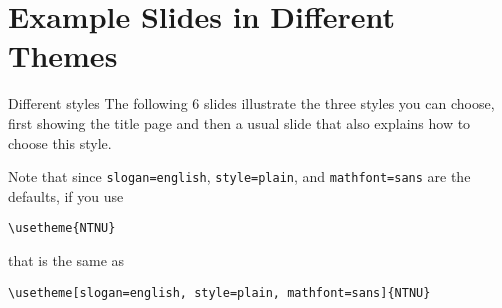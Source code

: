 \documentclass[aspectratio=169]{beamer}
\begin{document}
	\section{Example Slides in Different Themes}
	\begin{frame}[fragile]{Different styles}
		The following 6 slides illustrate the three styles you can choose,
		first showing the title page and then a usual slide that also explains how to choose this style.

		Note that since \lstinline!slogan=english!, \lstinline!style=plain!, and \lstinline!mathfont=sans! are the defaults, if you use

		\lstinline!\usetheme{NTNU}!

		that is the same as

		\lstinline!\usetheme[slogan=english, style=plain, mathfont=sans]{NTNU}!
	\end{frame}
	{
		
		
		
	}
\end{document}
